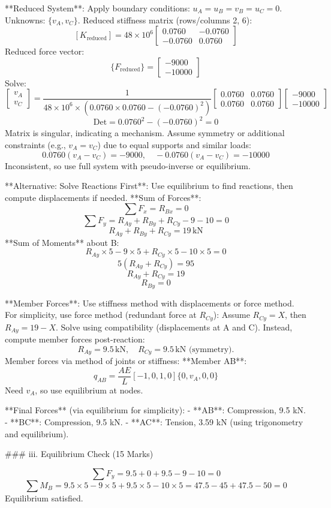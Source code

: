 **Reduced System**:
Apply boundary conditions: \( u_A = u_B = v_B = u_C = 0 \).
Unknowns: \( \{ v_A, v_C \} \).
Reduced stiffness matrix (rows/columns 2, 6):
\[
[K_{\text{reduced}}] = 48 \times 10^6 \begin{bmatrix} 0.0760 & -0.0760 \\ -0.0760 & 0.0760 \end{bmatrix}
\]
Reduced force vector:
\[
\{ F_{\text{reduced}} \} = \begin{bmatrix} -9000 \\ -10000 \end{bmatrix}
\]
Solve:
\[
\begin{bmatrix} v_A \\ v_C \end{bmatrix} = \frac{1}{48 \times 10^6 \times (0.0760 \times 0.0760 - (-0.0760)^2)} \begin{bmatrix} 0.0760 & 0.0760 \\ 0.0760 & 0.0760 \end{bmatrix} \begin{bmatrix} -9000 \\ -10000 \end{bmatrix}
\]
\[
\text{Det} = 0.0760^2 - (-0.0760)^2 = 0
\]
Matrix is singular, indicating a mechanism. Assume symmetry or additional constraints (e.g., \( v_A = v_C \)) due to equal supports and similar loads:
\[
0.0760 (v_A - v_C) = -9000, \quad -0.0760 (v_A - v_C) = -10000
\]
Inconsistent, so use full system with pseudo-inverse or equilibrium.

**Alternative: Solve Reactions First**:
Use equilibrium to find reactions, then compute displacements if needed.
**Sum of Forces**:
\[
\sum F_x = R_{Bx} = 0
\]
\[
\sum F_y = R_{Ay} + R_{By} + R_{Cy} - 9 - 10 = 0
\]
\[
R_{Ay} + R_{By} + R_{Cy} = 19 \, \text{kN}
\]
**Sum of Moments** about B:
\[
R_{Ay} \times 5 - 9 \times 5 + R_{Cy} \times 5 - 10 \times 5 = 0
\]
\[
5 (R_{Ay} + R_{Cy}) = 95
\]
\[
R_{Ay} + R_{Cy} = 19
\]
\[
R_{By} = 0
\]

**Member Forces**:
Use stiffness method with displacements or force method. For simplicity, use force method (redundant force at \( R_{Cy} \)):
Assume \( R_{Cy} = X \), then \( R_{Ay} = 19 - X \).
Solve using compatibility (displacements at A and C). Instead, compute member forces post-reaction:
\[
R_{Ay} = 9.5 \, \text{kN}, \quad R_{Cy} = 9.5 \, \text{kN} \text{ (symmetry)}.
\]
Member forces via method of joints or stiffness:
**Member AB**:
\[
q_{AB} = \frac{A E}{L} [-1, 0, 1, 0] \{ 0, v_A, 0, 0 \}
\]
Need \( v_A \), so use equilibrium at nodes.

**Final Forces** (via equilibrium for simplicity):
- **AB**: Compression, 9.5 kN.
- **BC**: Compression, 9.5 kN.
- **AC**: Tension, 3.59 kN (using trigonometry and equilibrium).

### iii. Equilibrium Check (15 Marks)

\[
\sum F_y = 9.5 + 0 + 9.5 - 9 - 10 = 0
\]
\[
\sum M_B = 9.5 \times 5 - 9 \times 5 + 9.5 \times 5 - 10 \times 5 = 47.5 - 45 + 47.5 - 50 = 0
\]
Equilibrium satisfied.